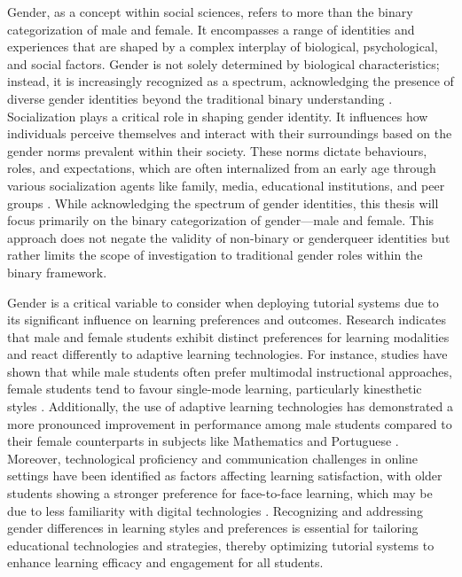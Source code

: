 Gender, as a concept within social sciences, refers to more than the binary categorization of male and female.
It encompasses a range of identities and experiences that are shaped by a complex interplay of biological, psychological, and social factors.
Gender is not solely determined by biological characteristics; instead, it is increasingly recognized as a spectrum, acknowledging the presence of diverse gender identities beyond the traditional binary understanding \parencite{lindqvistWhatGenderAnyway2021}.
Socialization plays a critical role in shaping gender identity. It influences how individuals perceive themselves and interact with their surroundings based on the gender norms prevalent within their society.
These norms dictate behaviours, roles, and expectations, which are often internalized from an early age through various socialization agents like family, media, educational institutions, and peer groups \parencite{kampshoffHandbuchGeschlechterforschungUnd2012}.
While acknowledging the spectrum of gender identities, this thesis will focus primarily on the binary categorization of gender—male and female.
This approach does not negate the validity of non-binary or genderqueer identities but rather limits the scope of investigation to traditional gender roles within the binary framework.

Gender is a critical variable to consider when deploying tutorial systems due to its significant influence on learning preferences and outcomes.
Research indicates that male and female students exhibit distinct preferences for learning modalities and react differently to adaptive learning technologies.
For instance, studies have shown that while male students often prefer multimodal instructional approaches, female students tend to favour single-mode learning, particularly kinesthetic styles \parencite{wehrweinGenderDifferencesLearning2007}.
Additionally, the use of adaptive learning technologies has demonstrated a more pronounced improvement in performance among male students compared to their female counterparts in subjects like Mathematics and Portuguese \parencite{desantanaEvaluatingImpactMars2016}.
Moreover, technological proficiency and communication challenges in online settings have been identified as factors affecting learning satisfaction, with older students showing a stronger preference for face-to-face learning, which may be due to less familiarity with digital technologies \parencite{dabajRoleGenderAge2009}.
Recognizing and addressing gender differences in learning styles and preferences is essential for tailoring educational technologies and strategies, thereby optimizing tutorial systems to enhance learning efficacy and engagement for all students.

